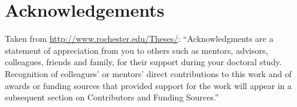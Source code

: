 \documentclass[\main/master.tex]{subfiles}
\begin{document}
\chapter*{Acknowledgements}
Taken from \url{http://www.rochester.edu/Theses/}: ``Acknowledgments are a statement of appreciation from you to others such as mentors, advisors, colleagues, friends and family, for their support during your doctoral study. Recognition of colleagues’ or mentors’ direct contributions to this work and of awards or funding sources that provided support for the work will appear in a subsequent section on Contributors and Funding Sources.''
\end{document}
